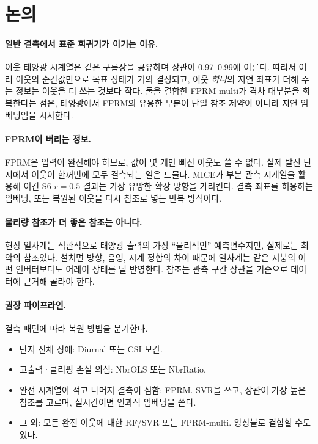 \documentclass[11pt,a4paper]{article}
\newcommand{\tabdir}{../tables/ko}
\begin{document}
\begin{table}[t]
  \centering\small
  \caption{S8 참조 스윕(S6 마스크, $r=0.5$, seed 2개). 참조별 RMSE(\%cap)의 범위와 (평균), FPRM-E1 대비 FPRM-ref의 상대 이득 평균(최소, 최대), FPRM-ref가 NbrRatio를 이긴 참조 수.}
  \label{tab:refsweep}
  \resizebox{\linewidth}{!}{}
\end{table}

\section{논의}\label{sec:discussion}

\paragraph{일반 결측에서 표준 회귀기가 이기는 이유.}
이웃 태양광 시계열은 같은 구름장을 공유하며 상관이 0.97--0.99에 이른다.
따라서 여러 이웃의 순간값만으로 목표 상태가 거의 결정되고, 이웃 \emph{하나}의 지연 좌표가 더해 주는 정보는 이웃을 더 쓰는 것보다 작다.
둘을 결합한 FPRM-multi가 격차 대부분을 회복한다는 점은, 태양광에서 FPRM의 유용한 부분이 단일 참조 제약이 아니라 지연 임베딩임을 시사한다.

\paragraph{FPRM이 버리는 정보.}
FPRM은 입력이 완전해야 하므로, 값이 몇 개만 빠진 이웃도 쓸 수 없다.
실제 발전 단지에서 이웃이 한꺼번에 모두 결측되는 일은 드물다.
MICE가 부분 관측 시계열을 활용해 이긴 S6 $r=0.5$ 결과는 가장 유망한 확장 방향을 가리킨다.
결측 좌표를 허용하는 임베딩, 또는 복원된 이웃을 다시 참조로 넣는 반복 방식이다.

\paragraph{물리량 참조가 더 좋은 참조는 아니다.}
현장 일사계는 직관적으로 태양광 출력의 가장 ``물리적인'' 예측변수지만, 실제로는 최악의 참조였다.
설치면 방향, 음영, 시계 정합의 차이 때문에 일사계는 같은 지붕의 어떤 인버터보다도 어레이 상태를 덜 반영한다.
참조는 관측 구간 상관을 기준으로 데이터에 근거해 골라야 한다.

\paragraph{권장 파이프라인.}
결측 패턴에 따라 복원 방법을 분기한다.
\begin{itemize}
  \item 단지 전체 장애: Diurnal 또는 CSI 보간.
  \item 고출력·클리핑 손실 의심: NbrOLS 또는 NbrRatio.
  \item 완전 시계열이 적고 나머지 결측이 심함: FPRM. SVR을 쓰고, 상관이 가장 높은 참조를 고르며, 실시간이면 인과적 임베딩을 쓴다.
  \item 그 외: 모든 완전 이웃에 대한 RF/SVR 또는 FPRM-multi. 앙상블로 결합할 수도 있다.
\end{itemize}
\end{document}
